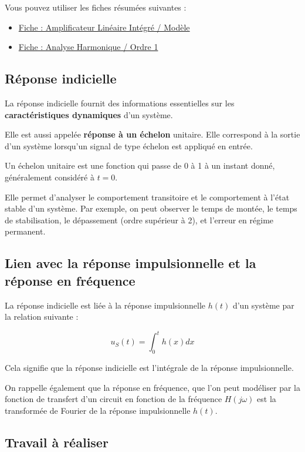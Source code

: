 Vous pouvez utiliser les fiches résumées suivantes : 

\begin{itemize}
	\item \hyperref[fiche:ALIModele]{Fiche : Amplificateur Linéaire Intégré / Modèle}
	\item \hyperref[fiche:AnHaOrdre1]{Fiche : Analyse Harmonique / Ordre 1}
\end{itemize}


\subsection{Réponse indicielle}

La réponse indicielle fournit des informations essentielles sur les \textbf{caractéristiques dynamiques} d'un système.

Elle est aussi appelée \textbf{réponse à un échelon} unitaire. Elle correspond à la sortie d'un système lorsqu'un signal de type échelon est appliqué en entrée.

Un échelon unitaire est une fonction qui passe de 0 à 1 à un instant donné, généralement considéré à $t = 0$. 

Elle permet d'analyser le comportement transitoire et le comportement à l'état stable d'un système. Par exemple, on peut observer le temps de montée, le temps de stabilisation, le dépassement (ordre supérieur à 2), et l'erreur en régime permanent.

\subsection{Lien avec la réponse impulsionnelle et la réponse en fréquence}

La réponse indicielle est liée à la réponse impulsionnelle $h(t)$ d'un système par la relation suivante :

$$u_S(t) = \int_{0}^t h(x)dx$$

Cela signifie que la réponse indicielle est l'intégrale de la réponse impulsionnelle.

On rappelle également que la réponse en fréquence, que l'on peut modéliser par la fonction de transfert d'un circuit en fonction de la fréquence $H(j\omega)$ est la transformée de Fourier de la réponse impulsionnelle $h(t)$.


\subsection{Travail à réaliser}

